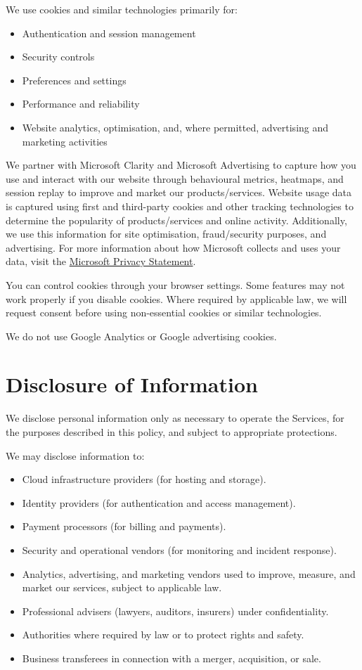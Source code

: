 \documentclass[11pt]{article}
\begin{document}
We use cookies and similar technologies primarily for:

\begin{itemize}
\item Authentication and session management
\item Security controls
\item Preferences and settings
\item Performance and reliability
\item Website analytics, optimisation, and, where permitted, advertising and marketing activities
\end{itemize}

We partner with Microsoft Clarity and Microsoft Advertising to capture how you use and interact with our website through behavioural metrics, heatmaps, and session replay to improve and market our products/services. Website usage data is captured using first and third-party cookies and other tracking technologies to determine the popularity of products/services and online activity. Additionally, we use this information for site optimisation, fraud/security purposes, and advertising. For more information about how Microsoft collects and uses your data, visit the \href{https://www.microsoft.com/privacy/privacystatement}{Microsoft Privacy Statement}.

You can control cookies through your browser settings. Some features may not work properly if you disable cookies. Where required by applicable law, we will request consent before using non-essential cookies or similar technologies.

We do not use Google Analytics or Google advertising cookies.

\section{Disclosure of Information}

We disclose personal information only as necessary to operate the Services, for the purposes described in this policy, and subject to appropriate protections.

We may disclose information to:

\begin{itemize}
\item Cloud infrastructure providers (for hosting and storage).
\item Identity providers (for authentication and access management).
\item Payment processors (for billing and payments).
\item Security and operational vendors (for monitoring and incident response).
\item Analytics, advertising, and marketing vendors used to improve, measure, and market our services, subject to applicable law.
\item Professional advisers (lawyers, auditors, insurers) under confidentiality.
\item Authorities where required by law or to protect rights and safety.
\item Business transferees in connection with a merger, acquisition, or sale.
\end{itemize}
\end{document}
